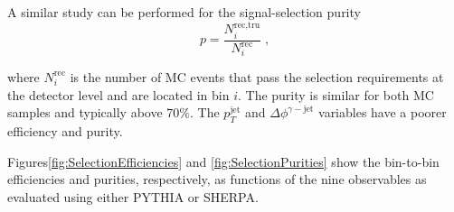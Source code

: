 \documentclass[12pt, twoside]{article}
\numberwithin{equation}{section}
\numberwithin{figure}{section}
\begin{document}
A similar study can be performed for the signal-selection purity
\begin{equation}    \label{eq:MCPurityBin}
    p = \frac{N^{\text{rec,tru}}_{i}}{N^{\text{rec}}_{i}} \; ,
\end{equation}

where $N^{\text{rec}}_{i}$ is the number of MC events that pass the selection requirements at the detector level and are located in bin $i$. The purity is similar for both MC samples and typically above $70 \%$. The $p^{\text{jet}}_{T}$ and $\Delta \phi^{\gamma-\text{jet}}$ variables have a poorer efficiency and purity.

Figures\;\ref{fig:SelectionEfficiencies} and \ref{fig:SelectionPurities} show the bin-to-bin efficiencies and purities, respectively, as functions of the nine observables as evaluated using either PYTHIA or SHERPA.
\end{document}
